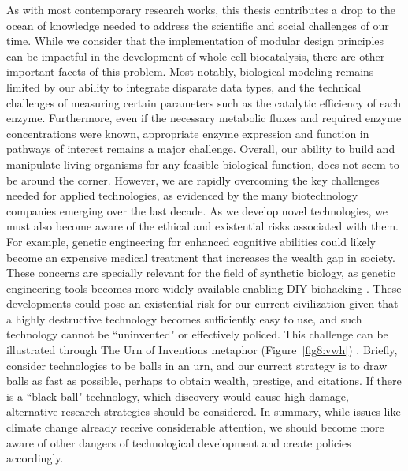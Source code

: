 
As with most contemporary research works, this thesis contributes a drop to the ocean of knowledge needed to address the scientific and social challenges of our time.
While we consider that the implementation of modular design principles can be impactful in the development of whole-cell biocatalysis, there are other important facets of this problem.
Most notably, biological modeling remains limited by our ability to integrate disparate data types, and the technical challenges of measuring certain parameters such as the catalytic efficiency of each enzyme.
Furthermore, even if the necessary metabolic fluxes and required enzyme concentrations were known, appropriate enzyme expression and function in pathways of interest remains a major challenge.
Overall, our ability to build and manipulate living organisms for any feasible biological function, does not seem to be around the corner.
However, we are rapidly overcoming the key challenges needed for applied technologies, as evidenced by the many biotechnology companies emerging over the last decade.
As we develop novel technologies, we must also become aware of the ethical and existential risks associated with them.
For example, genetic engineering for enhanced cognitive abilities could likely become an expensive medical treatment that increases the wealth gap in society.
These concerns are specially relevant for the field of synthetic biology, as genetic engineering tools becomes more widely available enabling DIY biohacking \citep{bennett2009}.
These developments could pose an existential risk for our current civilization given that a highly destructive technology becomes sufficiently easy to use,  and such technology cannot be ``uninvented" or effectively policed.
This challenge can be illustrated through The Urn of Inventions metaphor (Figure~\ref{fig8:vwh}) \citep{bostrom2019}. %
Briefly, consider technologies to be balls in an urn, and our current strategy is to draw balls as fast as possible, perhaps to obtain wealth, prestige, and citations.
If there is a ``black ball" technology, which discovery would cause high damage, alternative research strategies should be considered.
In summary, while issues like climate change already receive considerable attention, we should become more aware of other dangers of technological development and create policies accordingly.

